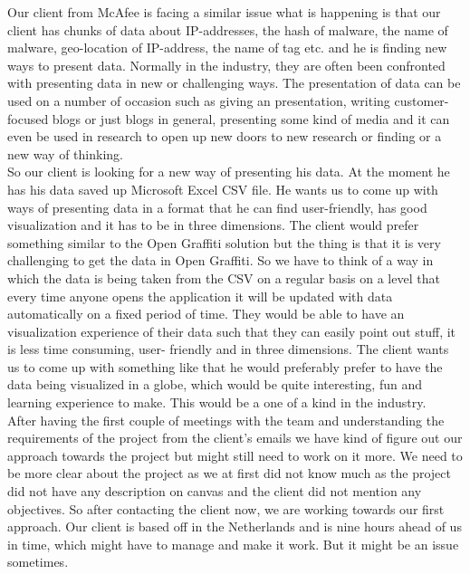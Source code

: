 \documentclass[letterpaper,10pt,titlepage, onecolumn]{IEEEtran}
\begin{document}
    Our client from McAfee is facing a similar issue what is happening is that our client has chunks of data about IP-addresses, the hash of malware, the name of malware, geo-location of IP-address, the name of tag etc. and he is finding new ways to present data. Normally in the industry, they are often been confronted with presenting data in new or challenging ways. The presentation of data can be used on a number of occasion such as giving an presentation, writing customer-focused blogs or just blogs in general, presenting some kind of media and it can even be used in research to open up new doors to new research or finding or a new way of thinking. \\


    So our client is looking for a new way of presenting his data. At the moment he has his data saved up Microsoft Excel CSV file. He wants us to come up with ways of presenting data in a format that he can find user-friendly, has good visualization and it has to be in three dimensions. The client would prefer something similar to the Open Graffiti solution but the thing is that it is very challenging to get the data in Open Graffiti. So we have to think of a way in which the data is being taken from the CSV on a regular basis on a level that every time anyone opens the application it will be updated with data automatically on a fixed period of time. They would be able to have an visualization experience of their data such that they can easily point out stuff, it is less time consuming, user- friendly and in three dimensions. The client wants us to come up with something like that he would preferably prefer to have the data being visualized in a globe, which would be quite interesting, fun and learning experience to make. This would be a one of a kind in the industry.\\ 


     After having the first couple of meetings with the team and understanding the requirements of the project from the client's emails we have kind of figure out our approach towards the project but might still need to work on it more. We need to be more clear about the project as we at first did not know much as the project did not have any description on canvas and the client did not mention any objectives. So after contacting the client now, we are working towards our first approach. Our client is based off in the Netherlands and is nine hours ahead of us in time, which might have to manage and make it work. But it might be an issue sometimes.\\
\end{document}
